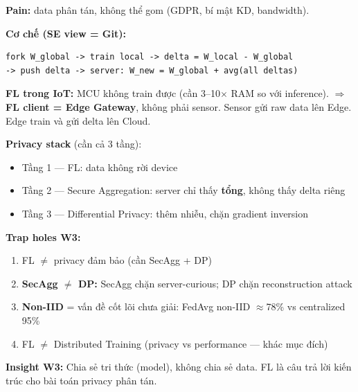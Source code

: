 \documentclass[9pt,a4paper,twocolumn]{article}
\begin{document}
\begin{tcolorbox}[weekbox, title={W3 --- Federated Learning (FL)}]

\textbf{Pain:} data phân tán, không thể gom (GDPR, bí mật KD, bandwidth).

\textbf{Cơ chế (SE view = Git):}
\begin{lstlisting}
fork W_global -> train local -> delta = W_local - W_global
-> push delta -> server: W_new = W_global + avg(all deltas)
\end{lstlisting}

\textbf{FL trong IoT:} MCU không train được (cần 3--10$\times$ RAM so với inference).
$\Rightarrow$ \textbf{FL client = Edge Gateway}, không phải sensor.
Sensor gửi raw data lên Edge. Edge train và gửi delta lên Cloud.

\textbf{Privacy stack} (cần cả 3 tầng):
\begin{itemize}
  \item Tầng 1 --- FL: data không rời device
  \item Tầng 2 --- Secure Aggregation: server chỉ thấy \textbf{tổng}, không thấy delta riêng
  \item Tầng 3 --- Differential Privacy: thêm nhiễu, chặn gradient inversion
\end{itemize}

\end{tcolorbox}

\begin{tcolorbox}[trapbox]
\scriptsize \textbf{Trap holes W3:}
\begin{enumerate}
  \item FL $\neq$ privacy đảm bảo (cần SecAgg + DP)
  \item \textbf{SecAgg $\neq$ DP:} SecAgg chặn server-curious; DP chặn reconstruction attack
  \item \textbf{Non-IID} = vấn đề cốt lõi chưa giải: FedAvg non-IID $\approx$78\% vs centralized 95\%
  \item FL $\neq$ Distributed Training (privacy vs performance --- khác mục đích)
\end{enumerate}
\end{tcolorbox}

\begin{tcolorbox}[insightbox]
\scriptsize \textbf{Insight W3:} Chia sẻ tri thức (model), không chia sẻ data.
FL là câu trả lời kiến trúc cho bài toán privacy phân tán.
\end{tcolorbox}
\end{document}
